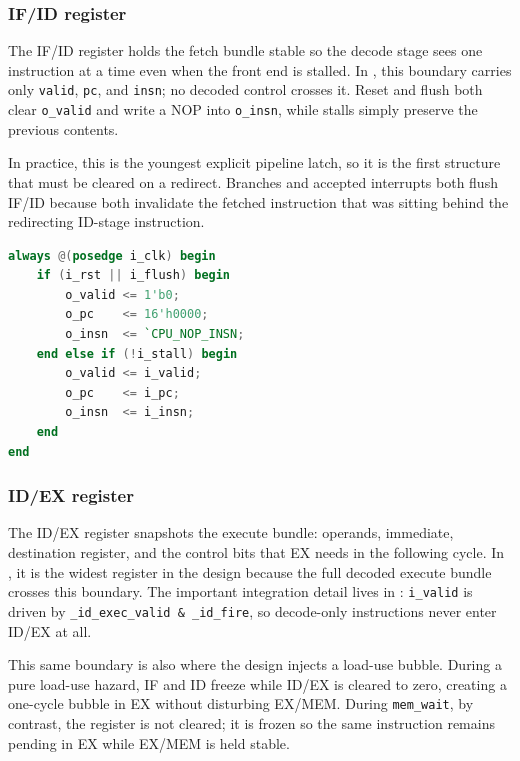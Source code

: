 \documentclass[11pt,a4paper]{article}
\begin{document}
\subsubsection{IF/ID register}

The IF/ID register holds the fetch bundle stable so the decode stage sees one instruction at a time even when the front end is stalled. In , this boundary carries only \texttt{valid}, \texttt{pc}, and \texttt{insn}; no decoded control crosses it. Reset and flush both clear \texttt{o\_valid} and write a NOP into \texttt{o\_insn}, while stalls simply preserve the previous contents.

In practice, this is the youngest explicit pipeline latch, so it is the first structure that must be cleared on a redirect. Branches and accepted interrupts both flush IF/ID because both invalidate the fetched instruction that was sitting behind the redirecting ID-stage instruction.

\begin{lstlisting}[language=Verilog,caption={IF/ID register behavior in \texttt{srcs/m\_pipe\_if\_id.v}}]
always @(posedge i_clk) begin
    if (i_rst || i_flush) begin
        o_valid <= 1'b0;
        o_pc    <= 16'h0000;
        o_insn  <= `CPU_NOP_INSN;
    end else if (!i_stall) begin
        o_valid <= i_valid;
        o_pc    <= i_pc;
        o_insn  <= i_insn;
    end
end
\end{lstlisting}

\subsubsection{ID/EX register}

The ID/EX register snapshots the execute bundle: operands, immediate, destination register, and the control bits that EX needs in the following cycle. In , it is the widest register in the design because the full decoded execute bundle crosses this boundary. The important integration detail lives in : \texttt{i\_valid} is driven by \texttt{\_id\_exec\_valid \& \_id\_fire}, so decode-only instructions never enter ID/EX at all.

This same boundary is also where the design injects a load-use bubble. During a pure load-use hazard, IF and ID freeze while ID/EX is cleared to zero, creating a one-cycle bubble in EX without disturbing EX/MEM. During \texttt{mem\_wait}, by contrast, the register is not cleared; it is frozen so the same instruction remains pending in EX while EX/MEM is held stable.
\end{document}
